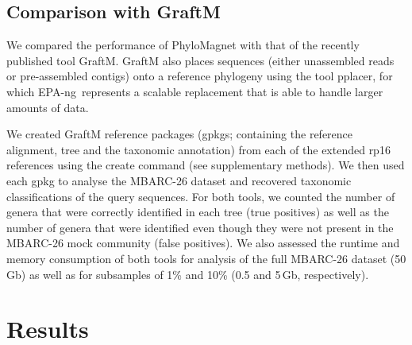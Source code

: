\documentclass{bioinfo}
\newcommand{\epa}{EPA-ng}
\begin{document}
\begin{methods}
\subsection{Comparison with GraftM}
We compared the performance of PhyloMagnet with that of the recently published tool GraftM. GraftM also places sequences (either unassembled reads or pre-assembled contigs) onto a reference phylogeny using the tool pplacer, for which \epa\ represents a scalable replacement that is able to handle larger amounts of data.

We created GraftM reference packages (gpkgs; containing the reference alignment, tree and the taxonomic annotation) from each of the extended rp16 references using the create command (see supplementary methods). We then used each gpkg to analyse the MBARC-26 dataset and recovered taxonomic classifications of the query sequences.
For both tools, we counted the number of genera that were correctly identified in each tree (true positives) as well as the number of genera that were identified even though they were not present in the MBARC-26 mock community (false positives). We also assessed the runtime and memory consumption of both tools for analysis of the full MBARC-26 dataset (50 Gb) as well as for subsamples of 1\% and 10\% (0.5 and 5\,Gb, respectively).

\end{methods}

\section{Results}
\end{document}
